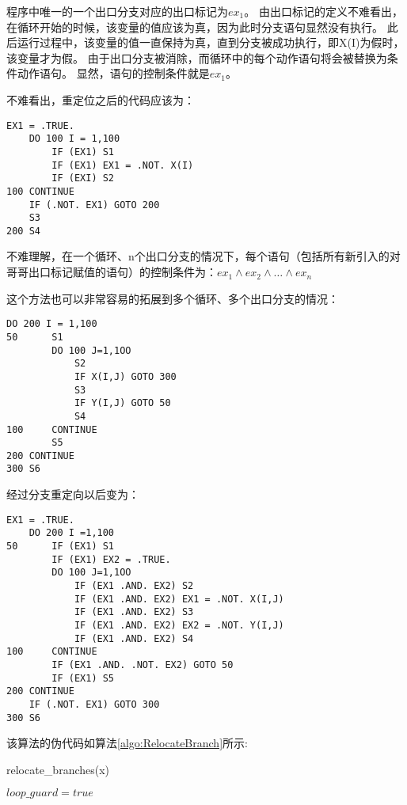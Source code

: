 程序中唯一的一个出口分支对应的出口标记为$ex_1$。
由出口标记的定义不难看出，在循环开始的时候，该变量的值应该为真，因为此时分支语句显然没有执行。
此后运行过程中，该变量的值一直保持为真，直到分支被成功执行，即X(I)为假时，该变量才为假。
由于出口分支被消除，而循环中的每个动作语句将会被替换为条件动作语句。
显然，语句的控制条件就是$ex_1$。

不难看出，重定位之后的代码应该为：
\begin{lstlisting}[language=FORTRAN]
	EX1 = .TRUE.
	DO 100 I = 1,100
		IF (EX1) S1
		IF (EX1) EX1 = .NOT. X(I)
		IF (EXI) S2
100	CONTINUE
	IF (.NOT. EX1) GOTO 200
	S3
200	S4
\end{lstlisting}

不难理解，在一个循环、n个出口分支的情况下，每个语句（包括所有新引入的对哥哥出口标记赋值的语句）的控制条件为：$ex_1\wedge{}ex_2\wedge\ldots{}\wedge{}ex_n$

这个方法也可以非常容易的拓展到多个循环、多个出口分支的情况：
\begin{lstlisting}[language=FORTRAN]
	DO 200 I = 1,100
50		S1
		DO 100 J=1,1OO
			S2
			IF X(I,J) GOTO 300
			S3
			IF Y(I,J) GOTO 50
			S4
100		CONTINUE
		S5
200	CONTINUE
300	S6
\end{lstlisting}
经过分支重定向以后变为：
\begin{lstlisting}[language=FORTRAN]
	EX1 = .TRUE.
	DO 200 I =1,100
50		IF (EX1) S1
		IF (EX1) EX2 = .TRUE.
		DO 100 J=1,1OO
			IF (EX1 .AND. EX2) S2
			IF (EX1 .AND. EX2) EX1 = .NOT. X(I,J)
			IF (EX1 .AND. EX2) S3
			IF (EX1 .AND. EX2) EX2 = .NOT. Y(I,J)
			IF (EX1 .AND. EX2) S4
100		CONTINUE
		IF (EX1 .AND. .NOT. EX2) GOTO 50
		IF (EX1) S5
200	CONTINUE
	IF (.NOT. EX1) GOTO 300
300	S6
\end{lstlisting}
该算法的伪代码如算法\ref{algo:RelocateBranch}所示:

\begin{algorithm}[H]
	\label{algo:RelocateBranch}
	\caption{relocate\_branches(x)}
	$loop\_guard = true$\;
\end{algorithm}


